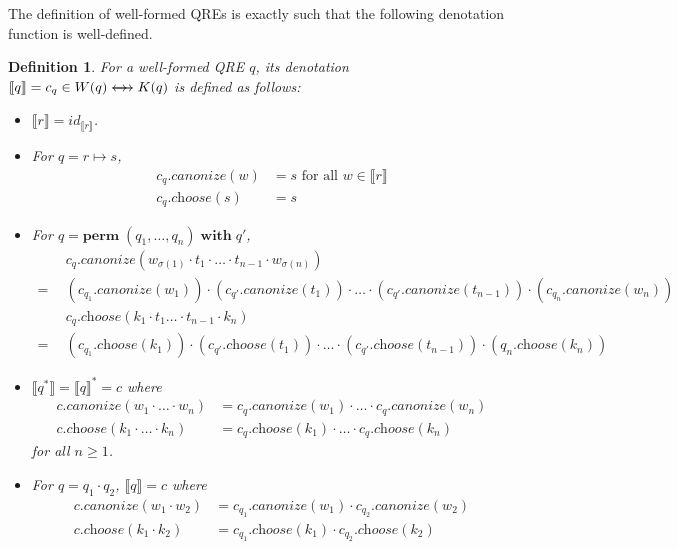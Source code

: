 \documentclass[a4paper,11pt] {article}
\theoremstyle{plain}
\newtheorem{definition}[theorem]{Definition}
\newcommand{\negjoinrel}{\mathrel{\mkern3mu}}
\newcommand{\rlaprel}[1]{\mathrel{\mathrlap{#1}}}
\newcommand{\lcanonize}[1]{\textit{$#1$.canonize}}
\newcommand{\lchoose}[1]{\textit{$#1$.choose}}
\newcommand{\canon}{\rlaprel{\longleftarrow}\rlaprel{\longrightarrow}
  \negjoinrel\rightarrow\;\,}
\newcommand{\perm}{ \textbf{perm}\; }
\newcommand{\with}{ \;\textbf{with}\; }
\begin{document}
The definition of well-formed QREs is exactly such that the following
denotation function is well-defined.
\begin{definition}
  For a well-formed QRE $q$, its denotation
  $\llbracket q \rrbracket = c_q \in W(q) \canon K(q)$ is defined as follows:
  \begin{itemize}
  \item $\llbracket r \rrbracket = \mathit{id}_{\llbracket r \rrbracket}$.
  \item For $q = r \mapsto s$, 
    \begin{align*}
      \lcanonize{c_q}(w) &= s \text{ for all
        $w \in \llbracket r \rrbracket$} \\
      \lchoose{c_q}(s) &= s
    \end{align*}
  \item For $q = \perm(q_1, \ldots, q_n) \with q'$, 
    \begin{align*}
      &~~\lcanonize{c_q}(w_{\sigma(1)} \cdot t_1 \cdot \ldots \cdot t_{n-1}
      \cdot w_{\sigma(n)}) \\
      =&~~ (\lcanonize{c_{q_1}}(w_1)) \cdot (\lcanonize{c_{q'}}(t_1)) \cdot
      \ldots 
      \cdot (\lcanonize{c_{q'}}(t_{n-1})) \cdot (\lcanonize{c_{q_n}}(w_n)) \\
      &~~\lchoose{c_q}(k_1 \cdot t_1 \ldots \cdot t_{n-1} \cdot k_n) \\
      =&~~ (\lchoose{c_{q_1}}(k_1)) \cdot (\lchoose{c_{q'}}(t_1)) \cdot
      \ldots \cdot (\lchoose{c_{q'}}(t_{n-1})) \cdot (\lchoose{q_n}(k_n))
    \end{align*}
  \item $\llbracket q^* \rrbracket = \llbracket q \rrbracket^* = c$ where 
    \begin{align*}
      \lcanonize{c}(w_1 \cdot \ldots \cdot w_n) &=
      \lcanonize{c_q}(w_1) \cdot \ldots \cdot
      \lcanonize{c_q}(w_n) \\
      \lchoose{c}(k_1 \cdot \ldots \cdot k_n) &=
      \lchoose{c_q}(k_1) \cdot \ldots \cdot
      \lchoose{c_q}(k_n)
    \end{align*}
    for all $n \geq 1$.
  \item For $q = q_1 \cdot q_2$, $\llbracket q \rrbracket = c$ where 
    \begin{align*}
      \lcanonize{c}(w_1 \cdot w_2) &=
      \lcanonize{c_{q_1}}(w_1) \cdot
      \lcanonize{c_{q_2}}(w_2) \\
      \lchoose{c}(k_1 \cdot k_2) &=
      \lchoose{c_{q_1}}(k_1) \cdot
      \lchoose{c_{q_2}}(k_2)
    \end{align*}

\end{itemize}
\end{definition}
\end{document}
